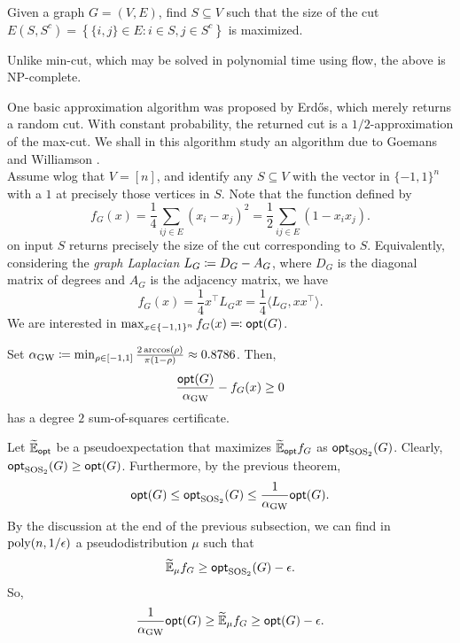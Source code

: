 	\begin{question*}
		Given a graph $G = (V,E)$, find $S \subseteq V$ such that the size of the cut $E(S,S^c) = \left\{ \{i,j\} \in E : i \in S, j \in S^c \right\}$ is maximized.
	\end{question*}

	Unlike min-cut, which may be solved in polynomial time using flow, the above is \textsf{NP}-complete.

	One basic approximation algorithm was proposed by Erd\H{o}s, which merely returns a random cut. With constant probability, the returned cut is a $1/2$-approximation of the max-cut. We shall in this algorithm study an algorithm due to Goemans and Williamson \cite{gw-maxcut}.\\
	Assume wlog that $V = [n]$, and identify any $S \subseteq V$ with the vector in $\{-1,1\}^n$ with a $1$ at precisely those vertices in $S$. Note that the function defined by
	\[ f_G(x) = \frac{1}{4} \sum_{ij \in E} (x_i - x_j)^2 = \frac{1}{2} \sum_{ij \in E} (1 - x_ix_j). \]
	on input $S$ returns precisely the size of the cut corresponding to $S$. Equivalently, considering the \emph{graph Laplacian} $L_G \coloneqq D_G - A_G$, where $D_G$ is the diagonal matrix of degrees and $A_G$ is the adjacency matrix, we have
	\[ f_G(x) = \frac{1}{4} x^\top L_G x = \frac{1}{4} \langle L_G , xx^\top \rangle. \]
	We are interested in $\max_{x \in \{-1,1\}^n} f_G(x) \eqqcolon \mathsf{opt}(G)$. %

	\begin{ftheo}
		\label{eqn: gw-sos}
		Set $\alpha_{\text{GW}} \coloneqq \min_{\rho \in [-1,1]} \frac{2\arccos(\rho)}{\pi(1-\rho)} \approx 0.8786$. Then,
		\[ \frac{\mathsf{opt}(G)}{\alpha_{\text{GW}}} - f_G(x) \ge 0 \]
		has a degree $2$ sum-of-squares certificate.
	\end{ftheo}

	Let $\widetilde{\mathbb{E}}_{\mathsf{opt}}$ be a pseudoexpectation that maximizes $\widetilde{\mathbb{E}}_{\mathsf{opt}} f_G$ as $\mathsf{opt}_{\text{SOS}_2}(G)$. Clearly, $\mathsf{opt}_{\text{SOS}_2}(G) \ge \mathsf{opt}(G)$. Furthermore, by the previous theorem,
	\[ \mathsf{opt}(G) \le \mathsf{opt}_{\text{SOS}_2}(G) \le \frac{1}{\alpha_{\text{GW}}} \mathsf{opt}(G). \]
	By the discussion at the end of the previous subsection, we can find in $\operatorname{poly}(n,1/\epsilon)$ a pseudodistribution $\mu$ such that
	\[ \widetilde{\mathbb{E}}_\mu f_G \ge \mathsf{opt}_{\text{SOS}_2}(G) - \epsilon. \]
	So,
	\[ \frac{1}{\alpha_{\text{GW}}} \mathsf{opt}(G) \ge \widetilde{\mathbb{E}}_\mu f_G \ge \mathsf{opt}(G) - \epsilon. \]

